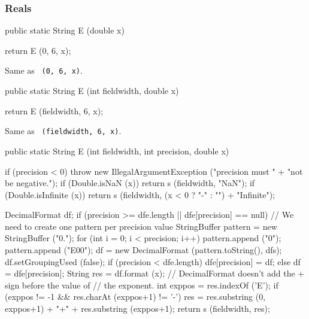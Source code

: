 \subsubsection*{Reals}
\begin{code}

   public static String E (double x)\begin{hide} {
        return E (0, 6, x);
   }\end{hide}
\end{code}
\begin{tabb}   Same as ~\texttt{(0, 6, x)}.
\end{tabb}
\begin{htmlonly}
\end{htmlonly}
\begin{code}

   public static String E (int fieldwidth, double x)\begin{hide} {
        return E (fieldwidth, 6, x);
   }\end{hide}
\end{code}
\begin{tabb}   Same as ~\texttt{(fieldwidth, 6, x)}.
\end{tabb}
\begin{htmlonly}
\end{htmlonly}
\begin{code}

   public static String E (int fieldwidth, int precision, double x)\begin{hide} {
        if (precision < 0)
            throw new IllegalArgumentException ("precision must " +
                                               "not be negative.");
        if (Double.isNaN (x))
           return s (fieldwidth, "NaN");
        if (Double.isInfinite (x))
           return s (fieldwidth, (x < 0 ? "-" : "") + "Infinite");

        DecimalFormat df;
        if (precision >= dfe.length || dfe[precision] == null) {
          // We need to create one pattern per precision value
          StringBuffer pattern = new StringBuffer ("0.");
          for (int i = 0; i < precision; i++)
              pattern.append ("0");
          pattern.append ("E00");
          df = new DecimalFormat (pattern.toString(), dfs);
          df.setGroupingUsed (false);
          if (precision < dfe.length)
            dfe[precision] = df;
        }
        else
          df = dfe[precision];
        String res = df.format (x);
        // DecimalFormat doesn't add the + sign before the value of
        // the exponent.
        int exppos = res.indexOf ('E');
        if (exppos != -1 && res.charAt (exppos+1) != '-')
            res = res.substring (0, exppos+1) + "+" + res.substring (exppos+1);
        return s (fieldwidth, res);
   }\end{hide}
\end{code}
